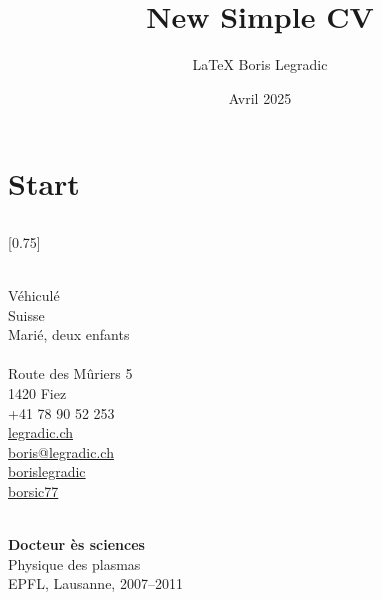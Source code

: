 \documentclass[verylight]{simplehipstercv}
\title{New Simple CV}
\author{\LaTeX{} Boris Legradic}
\date{Avril 2025}
\begin{document}
\thispagestyle{empty}

\section*{Start}

\subsection*{}
\vspace{4em}

\setlength{\columnsep}{1.5cm}
[0.75]
\begin{paracol}{2}
\paracolbackgroundoptions

\footnotesize
{\setasidefontcolour
\flushright

\bigskip \bigskip
\begin{center}
\end{center}
\bigskip \bigskip

\\[0.5em]
Véhiculé\\
Suisse\\
Marié, deux enfants\\

\bigskip \bigskip
{}\\[0.5em]
Route des Mûriers 5\\
1420 Fiez\\
+41 78 90 52 253\\

\bigskip
\href{https://legradic.ch}{legradic.ch }\\
\href{mailto:boris@legradic.ch}{boris@legradic.ch }\\
\href{https://www.linkedin.com/in/borislegradic}{borislegradic }\\
\href{https://github.com/borsic77}{borsic77 }

\bigskip \bigskip
{}\\[0.5em]
\textbf{Docteur ès sciences}\\
Physique des plasmas\\
EPFL, Lausanne, 2007–2011\\[0.5em]

}
\end{paracol}
\end{document}
